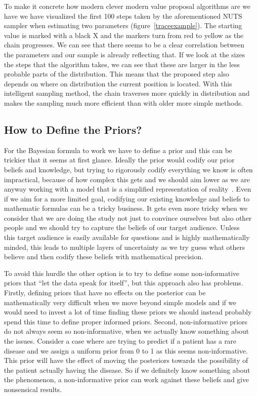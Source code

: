 \documentclass[12pt,a4paper,leqno]{report}
\theoremstyle{plain}
\theoremstyle{definition}
\theoremstyle{remark}
\begin{document}
To make it concrete how modern clever modern value proposal algorithms are we
have we have visualized the first 100 steps taken by the aforementioned NUTS sampler
when estimating two parameters (figure\ \ref{traceexample}). The starting value is
marked with a black X and the markers turn from red to yellow as the chain progresses.
We can see that there seems to be a clear correlation between the parameters and our
sample is already reflecting that. If we look at the sizes the steps that the algorithm
takes, we can see that these are larger in the less probable parts of the distribution.
This means that the proposed step also depends on where on distribution the current position
is located. With this intelligent sampling method, the chain traverses more
quickly in distribution and makes the sampling much more efficient than with older more
simple methods.

\subsection{How to Define the Priors?}\label{bayesproblems}

For the Bayesian formula to work we have to define a prior and this can be
trickier that it seems at first glance. Ideally the prior would codify our prior
beliefs and knowledge, but trying to rigorously codify everything we
know is often impractical, because of how complex this gets and we should aim lower as we are
anyway working with a model that is a simplified representation of reality\ \cite{gelman}. Even if
we aim for a more limited goal, codifying our existing knowledge and beliefs
to mathematic formulas can be a tricky business. It gets even more
tricky when we consider that we are doing the study not just to convince ourselves
but also other people and we should try to capture the beliefs of our target audience.
Unless this target audience is easily available for questions and is highly mathematically minded,
this leads to multiple layers of uncertainty as we try guess what others
believe and then codify these beliefs with mathematical precision.

To avoid this hurdle the other option is to try to define some non-informative
priors that ``let the data speak for itself'', but this approach also has
problems. Firstly, defining priors that have no effects on the posterior can be mathematically
very difficult when we move beyond simple models and if we would need
to invest a lot of time finding these priors we should instead probably spend this time
to define proper informed priors. Second, non-informative priors do not always
seem so non-informative, when we actually know something about the issues.
Consider a case where are trying to predict if a patient has a rare disease
and we assign a uniform prior from 0 to 1 as this seems non-informative. This
prior will have the effect of moving the posteriors towards the
possibility of the patient actually having the disease. So if we definitely know
something about the phenomenon, a non-informative prior can work against these
beliefs and give nonsensical results.\ \cite{gelman}
\end{document}
